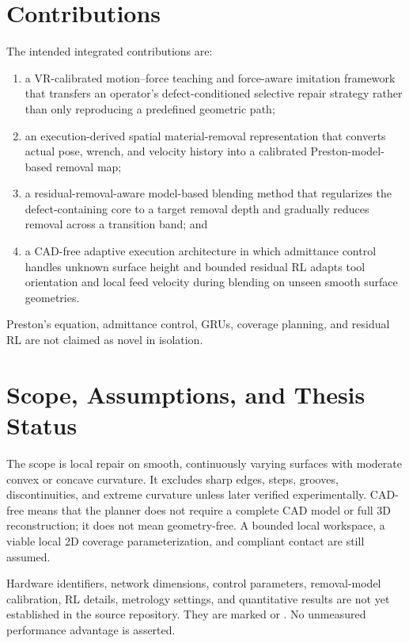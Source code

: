 \section{Contributions}
The intended integrated contributions are:
\begin{enumerate}
  \item a VR-calibrated motion--force teaching and force-aware imitation framework that transfers an operator's defect-conditioned selective repair strategy rather than only reproducing a predefined geometric path;
  \item an execution-derived spatial material-removal representation that converts actual pose, wrench, and velocity history into a calibrated Preston-model-based removal map;
  \item a residual-removal-aware model-based blending method that regularizes the defect-containing core to a target removal depth and gradually reduces removal across a transition band; and
  \item a CAD-free adaptive execution architecture in which admittance control handles unknown surface height and bounded residual RL adapts tool orientation and local feed velocity during blending on unseen smooth surface geometries.
\end{enumerate}
Preston's equation, admittance control, GRUs, coverage planning, and residual RL are not claimed as novel in isolation.

\section{Scope, Assumptions, and Thesis Status}
The scope is local repair on smooth, continuously varying surfaces with moderate convex or concave curvature. It excludes sharp edges, steps, grooves, discontinuities, and extreme curvature unless later verified experimentally. CAD-free means that the planner does not require a complete CAD model or full 3D reconstruction; it does not mean geometry-free. A bounded local workspace, a viable local 2D coverage parameterization, and compliant contact are still assumed.

Hardware identifiers, network dimensions, control parameters, removal-model calibration, RL details, metrology settings, and quantitative results are not yet established in the source repository. They are marked  or . No unmeasured performance advantage is asserted.

